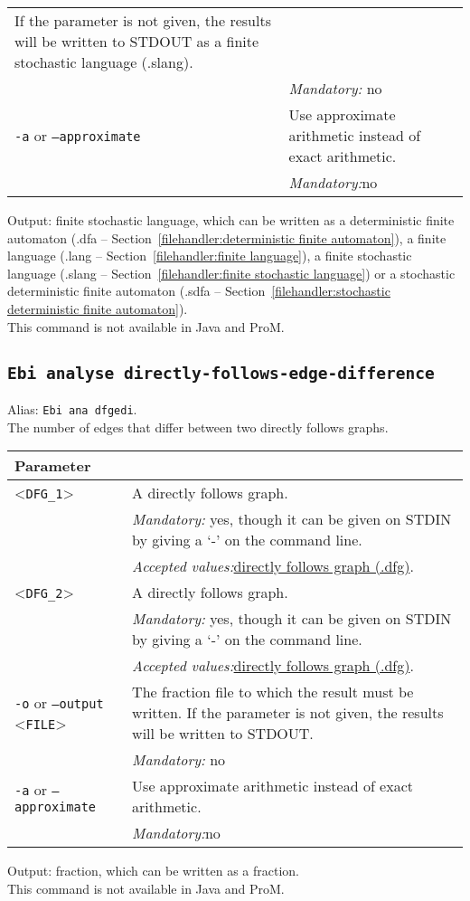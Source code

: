 {\begin{tabularx}{\linewidth}{lX}
If the parameter is not given, the results will be written to STDOUT as a finite stochastic language (.slang).\\
&\textit{Mandatory:} \quad no\\
\texttt{-a} or \texttt{--approximate} & Use approximate arithmetic instead of exact arithmetic.\\
&\textit{Mandatory:}\quad no\\
\bottomrule
\end{tabularx}
\noindent Output: finite stochastic language, which can be written as a deterministic finite automaton (.dfa -- Section~\ref{filehandler:deterministic finite automaton}), a finite language (.lang -- Section~\ref{filehandler:finite language}), a finite stochastic language (.slang -- Section~\ref{filehandler:finite stochastic language}) or a stochastic deterministic finite automaton (.sdfa -- Section~\ref{filehandler:stochastic deterministic finite automaton}).
\\This command is not available in Java and ProM.
\subsection{\texttt{Ebi analyse directly-follows-edge-difference}}
\label{command:Ebi analyse directly-follows-edge-difference}
Alias: \texttt{Ebi ana dfgedi}.\\
The number of edges that differ between two directly follows graphs.\\
\begin{tabularx}{\linewidth}{lX}
\toprule
Parameter \\\midrule
<\texttt{DFG\_1}>&A directly follows graph.\\
&\textit{Mandatory:} \quad yes, though it can be given on STDIN by giving a `-' on the command line.\\
&\textit{Accepted values:}\quad \hyperref[filehandler:directly follows graph]{directly follows graph (.dfg)}.\\
<\texttt{DFG\_2}>&A directly follows graph.\\
&\textit{Mandatory:} \quad yes, though it can be given on STDIN by giving a `-' on the command line.\\
&\textit{Accepted values:}\quad \hyperref[filehandler:directly follows graph]{directly follows graph (.dfg)}.\\
\texttt{-o} or \texttt{--output} <\texttt{FILE}> &
The fraction file to which the result must be written. If the parameter is not given, the results will be written to STDOUT.\\
&\textit{Mandatory:} \quad no\\
\texttt{-a} or \texttt{--approximate} & Use approximate arithmetic instead of exact arithmetic.\\
&\textit{Mandatory:}\quad no\\
\bottomrule
\end{tabularx}
\noindent Output: fraction, which can be written as a fraction.
\\This command is not available in Java and ProM.
}
